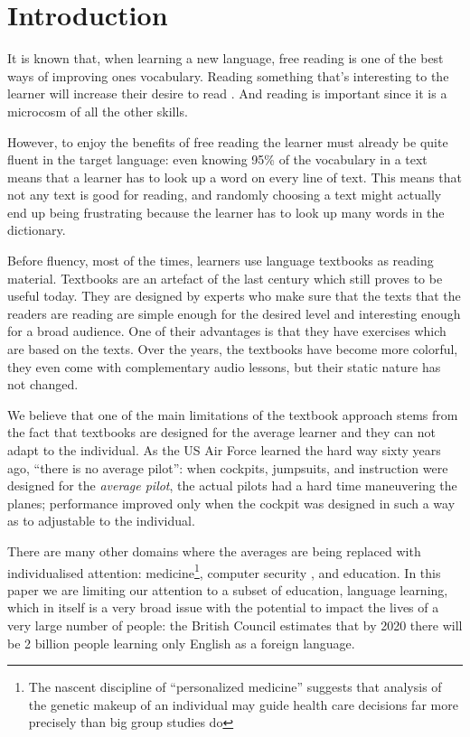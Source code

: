 
\newpage
\section{Introduction}

It is known that, when learning a new language, free reading is one of the best ways of improving ones vocabulary. Reading something that's interesting to the learner will increase their desire to read . And reading is important since it is a microcosm of all the other skills. \cite{mccarthy1999-microcosm} 

However, to enjoy the benefits of free reading the learner must already be quite fluent in the target language: even knowing 95\% of the vocabulary in a text means that a learner has to look up a word on every line of text. \cite{Hirsh92-vocab-size} This means that not any text is good for reading, and randomly choosing a text might actually end up being frustrating because the learner has to look up many words in the dictionary.

Before fluency, most of the times, learners use language textbooks as reading material. Textbooks are an artefact of the last century which still proves to be useful today. They are designed by experts who make sure that the texts that the readers are reading are simple enough for the desired level and interesting enough for a broad audience. One of their advantages is that they have exercises which are based on the texts. Over the years, the textbooks have become more colorful, they even come with complementary audio lessons, but their static nature has not changed.

We believe that one of the main limitations of the textbook approach stems from the fact that textbooks are designed for the average learner and they can not adapt to the individual. As the US Air Force learned the hard way sixty years ago, ``there is no average pilot'': when cockpits, jumpsuits, and instruction were designed for the {\em average pilot}, the actual pilots had a hard time maneuvering the planes; performance improved only when the cockpit was designed in such a way as to adjustable to the individual. 

There are many other domains where the averages are being replaced with individualised attention: medicine\footnote{The nascent discipline of ``personalized medicine'' suggests that analysis of the genetic makeup of an individual may guide health care decisions far more precisely than big group studies do}, computer security , and education. In this paper we are limiting our attention to a subset of education, language learning, which in itself is a very broad issue with the potential to impact the lives of a very large number of people: the British Council estimates that by 2020 there will be 2 billion people learning only English as a foreign language. 

